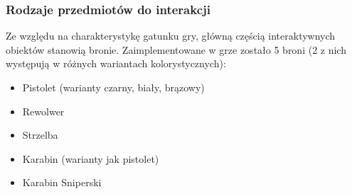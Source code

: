 \subsubsection{Rodzaje przedmiotów do interakcji}
Ze względu na charakterystykę gatunku gry, główną częścią interaktywnych obiektów stanowią bronie.
Zaimplementowane w grze zostało 5 broni (2 z nich występują w różnych wariantach kolorystycznych):
\begin{itemize}
    \item Pistolet (warianty czarny, biały, brązowy)
    \item Rewolwer
    \item Strzelba
    \item Karabin (warianty jak pistolet)
    \item Karabin Sniperski
\end{itemize}

